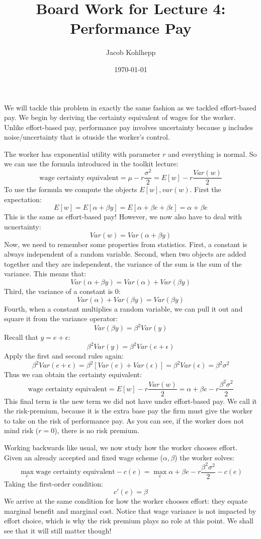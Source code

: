 \documentclass{article}
\title{Board Work for Lecture 4: Performance Pay}
\author{Jacob Kohlhepp}
\date{\today}
\begin{document}
\maketitle


We will tackle this problem in exactly the same fashion as we tackled effort-based pay. We begin by deriving the certainty equivalent of wages for the worker. Unlike effort-based pay, performance pay involves uncertainty because $y$ includes noise/uncertainty that is otuside the worker's control.

The worker has exponential utility with parameter $r$ and everything is normal. So we can use the formula introduced in the toolkit lecture:
\[\text{wage certainty equivalent} = \mu -r \frac{\sigma^2}{2}=E[w]- r \frac{Var(w)}{2}\]
To use the formula we compute the objects $E[w], var(w)$. First the expectation:
\[E[w] = E[\alpha+\beta y] = E[\alpha + \beta e + \beta \epsilon]=\alpha+ \beta e   \]
This is the same as effort-based pay! However, we now also have to deal with ucnertainty:
\[Var(w) = Var(\alpha + \beta y)\]
Now, we need to remember some properties from statistics. First, a constant is always independent of a random variable. Second, when two objects are added together and they are independent, the variance of the sum is the sum of the variance. This means that:
\[ Var(\alpha + \beta y)=Var(\alpha) + Var(\beta y)\]
Third, the variance of a constant is 0:
\[Var(\alpha) + Var(\beta y)=Var(\beta y)\]
Fourth, when a constant multiplies a random variable, we can pull it out and square it from the variance operator:
\[Var(\beta y)=\beta^2 Var(y) \]
Recall that $y=e+\epsilon$:
\[\beta^2 Var(y) = \beta^2 Var(e+\epsilon)\]
Apply the first and second rules again:
\[\beta^2 Var(e+\epsilon)=\beta^2 [Var(e) + Var(\epsilon)] =\beta^2Var(\epsilon)=\beta^2 \sigma^2 \]
Thus we can obtain the certainty equivalent:
\[\text{wage certainty equivalent} = E[w]- r \frac{Var(w)}{2} = \alpha+ \beta e - r\frac{\beta^2 \sigma^2}{2} \]
This final term is the new term we did not have under effort-based pay. We call it the risk-premium, because it is the extra base pay the firm must give the worker to take on the risk of performance pay. As you can see, if the worker does not mind risk ($r=0$), there is no risk premium.

Working backwards like usual, we now study how the worker chooses effort. Given an already accepted and fixed wage scheme ($\alpha, \beta$) the worker solves:
\[\max_e  \text{wage certainty equivalent} - c(e) = \max_e \alpha+ \beta e - r\frac{\beta^2 \sigma^2}{2} - c(e)\]
Taking the first-order condition:
\[c'(e) = \beta\]
We arrive at the same condition for how the worker chooses effort: they equate marginal benefit and marginal cost. Notice that wage variance is not impacted by effort choice, which is why the risk premium plays no role at this point. We shall see that it will still matter though!
\end{document}
